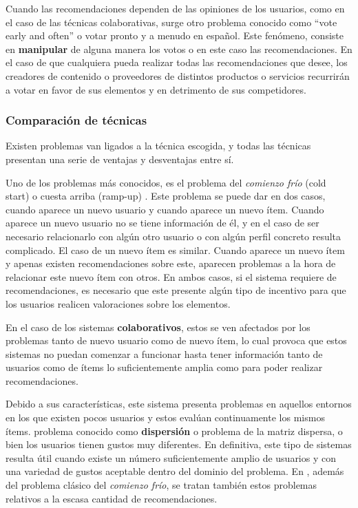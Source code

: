 Cuando las recomendaciones dependen de las opiniones de los usuarios, como en el caso de las técnicas colaborativas, surge otro problema conocido como ``vote early and often'' o votar pronto y a menudo en español. Este fenómeno, consiste en \textbf{manipular} de alguna manera los votos o en este caso las recomendaciones. En el caso de que cualquiera pueda realizar todas las recomendaciones que desee, los creadores de contenido o proveedores de distintos productos o servicios recurrirán a votar en favor de sus elementos y en detrimento de sus competidores.

\subsubsection{Comparación de técnicas}
Existen problemas van ligados a la técnica escogida, y todas las técnicas presentan una serie de ventajas y desventajas entre sí.

Uno de los problemas más conocidos, es el problema del \textit{comienzo frío} (cold start) o cuesta arriba (ramp-up) \cite{lee2001collaborative}. Este problema se puede dar en dos casos, cuando aparece un nuevo usuario\cite{Rashid:2002:GKY:502716.502737} y cuando aparece un nuevo ítem. Cuando aparece un nuevo usuario no se tiene información de él, y en el caso de ser necesario relacionarlo con algún otro usuario o con algún perfil concreto resulta complicado. El caso de un nuevo ítem es similar. Cuando aparece un nuevo ítem y apenas existen recomendaciones sobre este, aparecen problemas a la hora de relacionar este nuevo ítem con otros. En ambos casos, si el sistema requiere de recomendaciones, es necesario que este presente algún tipo de incentivo para que los usuarios realicen valoraciones sobre los elementos.

En el caso de los sistemas \textbf{colaborativos}, estos se ven afectados por los problemas tanto de nuevo usuario como de nuevo ítem, lo cual provoca que estos sistemas no puedan comenzar a funcionar hasta tener información tanto de usuarios como de ítems lo suficientemente amplia como para poder realizar recomendaciones. 

Debido a sus características, este sistema presenta problemas en aquellos entornos en los que existen pocos usuarios y estos evalúan continuamente los mismos ítems. problema conocido como \textbf{dispersión} o problema de la matriz dispersa\cite{Huang:2004:AAR:963770.963775}, o bien los usuarios tienen gustos muy diferentes. En definitiva, este tipo de sistemas resulta útil cuando existe un número suficientemente amplio de usuarios y con una variedad de gustos aceptable dentro del dominio del problema. En \cite{lee2001collaborative}, además del problema clásico del \textit{comienzo frío}, se tratan también estos problemas relativos a la escasa cantidad de recomendaciones.

